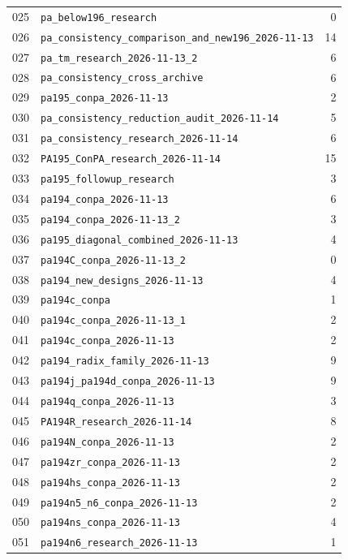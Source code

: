 \begin{longtable}{rL{124mm}r}
025 & \nolinkurl{pa_below196_research} & 0\\[0.5pt]
026 & \nolinkurl{pa_consistency_comparison_and_new196_2026-11-13} & 14\\[0.5pt]
027 & \nolinkurl{pa_tm_research_2026-11-13_2} & 6\\[0.5pt]
028 & \nolinkurl{pa_consistency_cross_archive} & 6\\[0.5pt]
029 & \nolinkurl{pa195_conpa_2026-11-13} & 2\\[0.5pt]
030 & \nolinkurl{pa_consistency_reduction_audit_2026-11-14} & 5\\[0.5pt]
031 & \nolinkurl{pa_consistency_research_2026-11-14} & 6\\[0.5pt]
032 & \nolinkurl{PA195_ConPA_research_2026-11-14} & 15\\[0.5pt]
033 & \nolinkurl{pa195_followup_research} & 3\\[0.5pt]
034 & \nolinkurl{pa194_conpa_2026-11-13} & 6\\[0.5pt]
035 & \nolinkurl{pa194_conpa_2026-11-13_2} & 3\\[0.5pt]
036 & \nolinkurl{pa195_diagonal_combined_2026-11-13} & 4\\[0.5pt]
037 & \nolinkurl{pa194C_conpa_2026-11-13_2} & 0\\[0.5pt]
038 & \nolinkurl{pa194_new_designs_2026-11-13} & 4\\[0.5pt]
039 & \nolinkurl{pa194c_conpa} & 1\\[0.5pt]
040 & \nolinkurl{pa194c_conpa_2026-11-13_1} & 2\\[0.5pt]
041 & \nolinkurl{pa194c_conpa_2026-11-13} & 2\\[0.5pt]
042 & \nolinkurl{pa194_radix_family_2026-11-13} & 9\\[0.5pt]
043 & \nolinkurl{pa194j_pa194d_conpa_2026-11-13} & 9\\[0.5pt]
044 & \nolinkurl{pa194q_conpa_2026-11-13} & 3\\[0.5pt]
045 & \nolinkurl{PA194R_research_2026-11-14} & 8\\[0.5pt]
046 & \nolinkurl{pa194N_conpa_2026-11-13} & 2\\[0.5pt]
047 & \nolinkurl{pa194zr_conpa_2026-11-13} & 2\\[0.5pt]
048 & \nolinkurl{pa194hs_conpa_2026-11-13} & 2\\[0.5pt]
049 & \nolinkurl{pa194n5_n6_conpa_2026-11-13} & 2\\[0.5pt]
050 & \nolinkurl{pa194ns_conpa_2026-11-13} & 4\\[0.5pt]
051 & \nolinkurl{pa194n6_research_2026-11-13} & 1\\[0.5pt]

\end{longtable}
